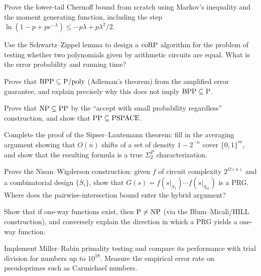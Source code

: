 \begin{exercise}[Intermediate]
Prove the lower-tail Chernoff bound from scratch using Markov's inequality and the moment generating function, including the step $\ln(1 - p + p e^{-\lambda}) \le -p\lambda + p\lambda^2/2$.
\end{exercise}

\begin{exercise}[Intermediate]
Use the Schwartz--Zippel lemma to design a $\text{coRP}$ algorithm for the problem of testing whether two polynomials given by arithmetic circuits are equal. What is the error probability and running time?
\end{exercise}

\begin{exercise}[Intermediate]
Prove that $\text{BPP} \subseteq \text{P}/\text{poly}$ (Adleman's theorem) from the amplified error guarantee, and explain precisely why this does not imply $\text{BPP} \subseteq \text{P}$.
\end{exercise}

\begin{exercise}[Intermediate]
Prove that $\text{NP} \subseteq \text{PP}$ by the ``accept with small probability regardless'' construction, and show that $\text{PP} \subseteq \text{PSPACE}$.
\end{exercise}

\begin{exercise}[Challenge]
Complete the proof of the Sipser--Lautemann theorem: fill in the averaging argument showing that $O(n)$ shifts of a set of density $1 - 2^{-n}$ cover $\{0,1\}^m$, and show that the resulting formula is a true $\Sigma_2^P$ characterization.
\end{exercise}

\begin{exercise}[Challenge]
Prove the Nisan--Wigderson construction: given $f$ of circuit complexity $2^{\Omega(n)}$ and a combinatorial design $\{S_i\}$, show that $G(s) = f(s|_{S_1}) \cdots f(s|_{S_m})$ is a PRG. Where does the pairwise-intersection bound enter the hybrid argument?
\end{exercise}

\begin{exercise}[Challenge]
Show that if one-way functions exist, then $\text{P} \neq \text{NP}$ (via the Blum--Micali/HILL construction), and conversely explain the direction in which a PRG yields a one-way function.
\end{exercise}

\begin{exercise}[Computational]
Implement Miller--Rabin primality testing and compare its performance with trial division for numbers up to $10^{18}$. Measure the empirical error rate on pseudoprimes such as Carmichael numbers.
\end{exercise}


